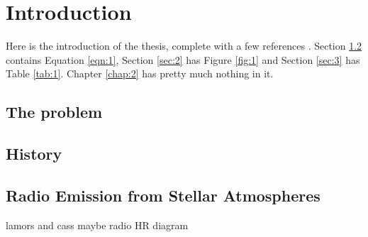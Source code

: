 \chapter{Introduction}
\label{chap:1}


\label{chap:1}
 
 
Here is the introduction of the thesis, complete with a few references  \citep{sagan1997demon, prothero2007evolution}.  Section \ref{sec:1} contains Equation \ref{eqn:1}, Section \ref{sec:2} has Figure \ref{fig:1} and Section \ref{sec:3} has Table \ref{tab:1}. Chapter \ref{chap:2} has pretty much nothing in it.
\pagebreak
\section{The problem}\label{sec:1}
\section{History}\label{sec:1}
 
\section{Radio Emission from Stellar Atmospheres} 
lamors and cass
maybe radio HR diagram

